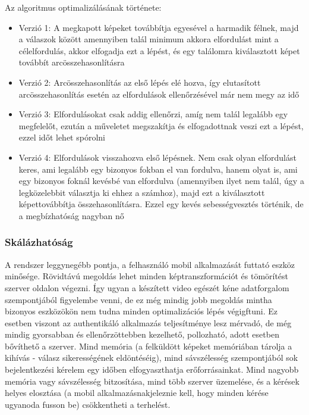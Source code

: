 Az algoritmus optimalizálásának története:
\begin{itemize}
\item Verzió 1: A megkapott képeket továbbítja egyesével a harmadik félnek, majd a válaszok között amennyiben talál minimum akkora elfordulást mint a célelfordulás, akkor elfogadja ezt a lépést, és egy találomra kiválasztott képet továbbít arcösszehasonlításra
\item Verzió 2: Arcösszehasonlítás az első lépés elé hozva, így elutasított arcösszehasonlítás esetén az elfordulások ellenőrzésével már nem megy az idő
\item Verzió 3: Elfordulásokat csak addig ellenőrzi, amíg nem talál legalább egy megfelelőt, ezután a műveletet megszakítja és elfogadottnak veszi ezt a lépést, ezzel időt lehet spórolni
\item Verzió 4: Elfordulások visszahozva első lépésnek. Nem csak olyan elfordulást keres, ami legalább egy bizonyos fokban el van fordulva, hanem olyat is, ami egy bizonyos foknál kevésbé van elfordulva (amennyiben ilyet nem talál, úgy a legközelebbit választja ki ehhez a számhoz), majd ezt a kiválasztott képettovábbítja összehasonlításra. Ezzel egy kevés sebességvesztés történik, de a megbízhatóság nagyban nő
\end{itemize}

\subsubsection{Skálázhatóság}
A rendszer leggynegébb pontja, a felhasználó mobil alkalmazását futtató eszköz minősége. Rövidtávú megoldás lehet minden képtranszformációt és tömörítést szerver oldalon végezni. Így ugyan a készített video egészét kéne adatforgalom szempontjából figyelembe venni, de ez még mindig jobb megoldás mintha bizonyos eszközökön nem tudna minden optimalizációs lépés végigftuni.
Ez esetben viszont az authentikáló alkalmazás teljesítménye lesz mérvadó, de még mindig gyorsabban és ellenőrzöttebben kezelhető, pollozható, adott esetben bővíthető a szerver. Mind memória (a felküldött képeket memóriában tárolja a kihívás - válasz sikerességének eldöntéséig), mind sávszélesség szempontjából sok bejelentkezési kérelem egy időben elfogyaszthatja erőforrásainkat. Mind nagyobb memória vagy sávszélesség bitzosítása, mind több szerver üzemelése, és a kérések helyes elosztása (a mobil alkalmazásnakjeleznie kell, hogy minden kérése ugyanoda fusson be) csökkentheti a terhelést.



